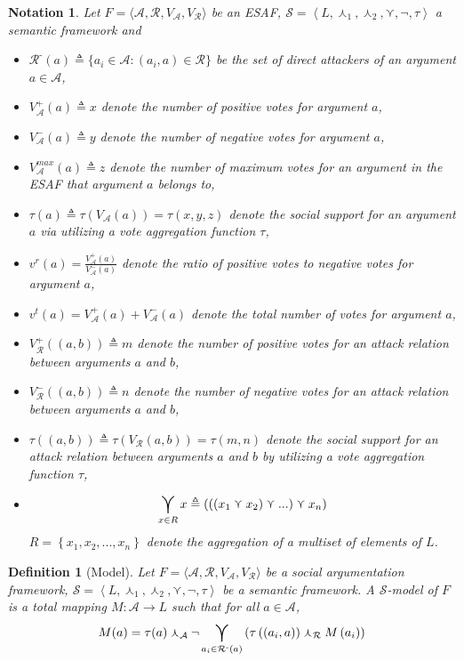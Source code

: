 \documentclass{article}
\newtheorem{definition}{Definition}
\newtheorem{notation}{Notation}
\newcommand{\args}{\mathcal{A}} %
\newcommand{\att}{\mathcal{R}}  %
\newcommand{\valueset}{L}
\newcommand{\varg}{V_{\args}}   %
\newcommand{\vargpro}[1]{\varg^+\left(#1\right)} %
\newcommand{\vargcon}[1]{\varg^-\left(#1\right)} %
\newcommand{\vargtot}[1]{\varg^{max}\left(#1\right)} %
\newcommand{\vatt}{V_{\att}}   %
\newcommand{\vattpro}[1]{\vatt^+\left(#1\right)} %
\newcommand{\vattcon}[1]{\vatt^-\left(#1\right)} %
\newcommand{\attackers}[1]{\att^\text{-}\left(#1\right)}
\newcommand{\safid}{F}               %
\newcommand{\saf}{\safid = \safbody} %
\newcommand{\safbody}{\langle \args, \att, \varg, \vatt \rangle} %
\newcommand{\semid}{\mathcal{S}}        %
\newcommand{\sembody}{\left\langle \valueset,\SAFand_1, \SAFand_2,\SAFor,\lnot,\tau \right\rangle}
\newcommand{\semdef}{\semid = \sembody}     %
\newcommand{\SAFand}{\curlywedge}     %
\newcommand{\SAFor}{\curlyvee}        %
\DeclareMathOperator*{\SAFOr}{\bigcurlyvee} %
\newcommand{\sem}{\mathcal{S}}
\begin{document}
\begin{notation}
Let $\saf$ be an ESAF, $\sem = \sembody$ a semantic framework and
\begin{itemize}
\item $\attackers{a} \triangleq \{a_i \in \args: (a_i, a) \in \att\}$ be the set of direct attackers of an argument $a \in \args$, 
\item $\vargpro a \triangleq x$ denote the number of positive votes for argument $a$,
\item $\vargcon a \triangleq y$ denote the number of negative votes for argument $a$,
\item $\vargtot a \triangleq z$ denote the number of maximum votes for an argument in the ESAF that argument $a$ belongs to, 
\item $\tau(a) \triangleq \tau(V_{\mathcal{A}}(a))= \tau(x, y, z)$ denote the social support for an argument $a$ via utilizing a vote aggregation function $\tau$, %
\item $v^r(a) = \frac{\vargpro a}{\vargcon a}$ denote the ratio of positive votes to negative votes for argument $a$,
\item $v^t(a) =\vargpro a + \vargcon a$ denote the total number of votes for argument $a$,
\item $\vattpro{(a, b)} \triangleq m$ denote the number of positive votes for an attack relation between arguments  $a$ and $b$,
\item  $ \vattcon{(a, b)}  \triangleq n$ denote the number of negative votes for an attack relation between arguments  $a$ and $b$,
\item  $\tau((a, b)) \triangleq \tau(\vatt(a,b)) = \tau(m, n)$ denote the social support for an attack relation between arguments  $a$ and $b$ by utilizing a vote aggregation function $\tau$,
\item$$\SAFOr_{x \in R} x \triangleq\left(\left(\left(  x_{1}\SAFor x_{2}\right) \SAFor...\right)\SAFor x_{n}\right)$$ $R=\left\{  x_{1},x_{2},...,x_{n}\right\}$ denote the aggregation of a multiset of elements of $\valueset$. 
\end{itemize}
\end{notation}

\begin{definition}[Model]
\label{def:model}
  Let $\saf$ be a social argumentation framework, $\semdef$ be a semantic framework. A $\semid$-model of $\safid$ is a total mapping $M : \args \rightarrow \valueset$ such that for all $a \in \args$,
  $$\displaystyle M(a) = \tau(a) \SAFand_\args \lnot \SAFOr_{a_i \in \attackers{a}} \left(\tau\left((a_i, a)\right) \SAFand_\att M\left(a_i\right)\right)$$
\end{definition}
\end{document}
